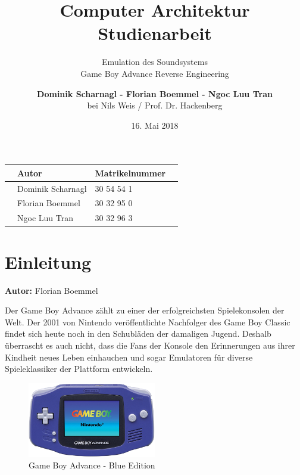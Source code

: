 \documentclass[11pt,a4paper]{scrartcl}
\title{\vspace{5cm}\huge Computer Architektur \\ \Large Studienarbeit \vspace{1cm}}
\subtitle{\Huge Emulation des Soundsystems \\ \Large Game Boy Advance Reverse Engineering \vspace{1cm}}
\author{\large \textbf{Dominik Scharnagl - Florian Boemmel - Ngoc Luu Tran}\\ \normalsize bei Nils Weis / Prof. Dr. Hackenberg}
\date{\normalsize 16. Mai 2018}
\newcommand{\AutorFlorian} {
    \vspace{-4mm}
    \large \textbf{Autor:} Florian Boemmel \normalsize
    \vspace{2mm}
}
\begin{document}
\sffamily

\maketitle
\thispagestyle{empty}

\vspace{5cm}
\begin{table}[h]
    \centering
    \begin{tabular}{ p{4cm} p{5cm}|p{5cm} p{2cm} }
        & \textbf{Autor} & \textbf{Matrikelnummer} & \\
        \hline
        & Dominik Scharnagl & 30 54 54 1 & \\
        & Florian Boemmel & 30 32 95 0 & \\
        & Ngoc Luu Tran & 30 32 96 3 &
    \end{tabular}
\end{table}


\clearpage

\setcounter{page}{1}


\tableofcontents
\clearpage
{}


\printindex
\clearpage


\section{Einleitung} \label{Einleitung}
\AutorFlorian

Der Game Boy Advance z\"ahlt zu einer der erfolgreichsten Spielekonsolen der Welt. Der 2001 von Nintendo \cite{NintendoGeschichte} ver\"offentlichte Nachfolger des Game Boy Classic findet sich heute noch in den Schubl\"aden der damaligen Jugend. Deshalb \"uberrascht es auch nicht, dass die Fans der Konsole den Erinnerungen aus ihrer Kindheit neues Leben einhauchen und sogar Emulatoren f\"ur diverse Spieleklassiker der Plattform entwickeln.

\begin{figure}[h]
    \centering
    \includegraphics[width=0.5\textwidth]{GameBoyAdvance}
    \caption{Game Boy Advance - Blue Edition}
    \label{fig:gba}
\end{figure}
\end{document}
